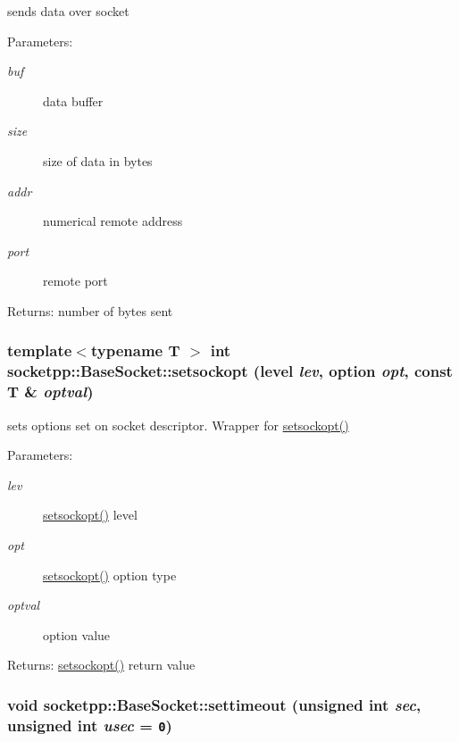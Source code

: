 sends data over socket 

\begin{Desc}
\item[Parameters:]
\begin{description}
\item[{\em buf}]data buffer \item[{\em size}]size of data in bytes \item[{\em addr}]numerical remote address \item[{\em port}]remote port \end{description}
\end{Desc}
\begin{Desc}
\item[Returns:]number of bytes sent \end{Desc}
\hypertarget{classsocketpp_1_1BaseSocket_3f1f168e4953c046bb1159941da2fa30}{
\subsubsection[{setsockopt}]{\setlength{\rightskip}{0pt plus 5cm}template$<$typename T $>$ int socketpp::BaseSocket::setsockopt ({\bf level} {\em lev}, \/  {\bf option} {\em opt}, \/  const T \& {\em optval})}}
\label{classsocketpp_1_1BaseSocket_3f1f168e4953c046bb1159941da2fa30}


sets options set on socket descriptor. Wrapper for \hyperlink{classsocketpp_1_1BaseSocket_3f1f168e4953c046bb1159941da2fa30}{setsockopt()} 

\begin{Desc}
\item[Parameters:]
\begin{description}
\item[{\em lev}]\hyperlink{classsocketpp_1_1BaseSocket_3f1f168e4953c046bb1159941da2fa30}{setsockopt()} level \item[{\em opt}]\hyperlink{classsocketpp_1_1BaseSocket_3f1f168e4953c046bb1159941da2fa30}{setsockopt()} option type \item[{\em optval}]option value \end{description}
\end{Desc}
\begin{Desc}
\item[Returns:]\hyperlink{classsocketpp_1_1BaseSocket_3f1f168e4953c046bb1159941da2fa30}{setsockopt()} return value \end{Desc}
\hypertarget{classsocketpp_1_1BaseSocket_49718984476b4126889d3a26045b1fdc}{
\subsubsection[{settimeout}]{\setlength{\rightskip}{0pt plus 5cm}void socketpp::BaseSocket::settimeout (unsigned int {\em sec}, \/  unsigned int {\em usec} = {\tt 0})}}
\label{classsocketpp_1_1BaseSocket_49718984476b4126889d3a26045b1fdc}


